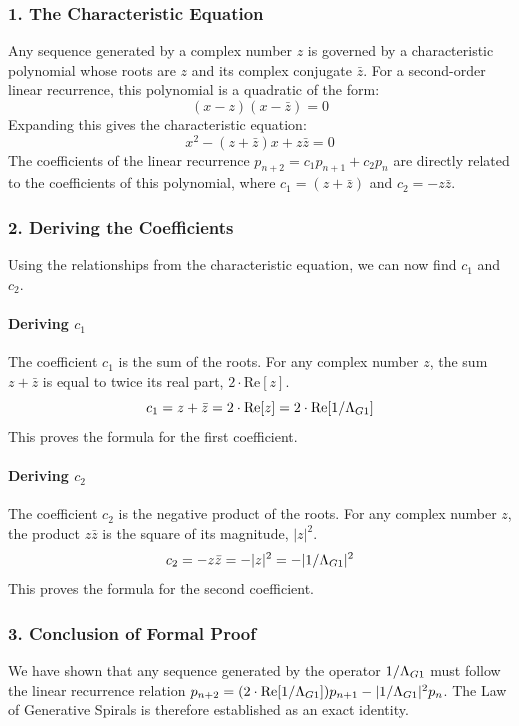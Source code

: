 \subsubsection{1. The Characteristic Equation}
Any sequence generated by a complex number $z$ is governed by a characteristic polynomial whose roots are $z$ and its complex conjugate $\bar{z}$. For a second-order linear recurrence, this polynomial is a quadratic of the form:
$$ (x - z)(x - \bar{z}) = 0 $$
Expanding this gives the characteristic equation:
$$ x^2 - (z + \bar{z})x + z\bar{z} = 0 $$
The coefficients of the linear recurrence $p_{n+2} = c_1 p_{n+1} + c_2 p_n$ are directly related to the coefficients of this polynomial, where $c_1 = (z+\bar{z})$ and $c_2 = -z\bar{z}$.

\subsubsection{2. Deriving the Coefficients}
Using the relationships from the characteristic equation, we can now find $c_1$ and $c_2$.

\paragraph{Deriving $c_1$}
The coefficient $c_1$ is the sum of the roots. For any complex number $z$, the sum $z+\bar{z}$ is equal to twice its real part, $2 \cdot \text{Re}[z]$.
$$ c_1 = z + \bar{z} = 2 \cdot \text{Re}[z] = 2 \cdot \text{Re}[1/\Lambda_{G1}] $$
This proves the formula for the first coefficient.

\paragraph{Deriving $c_2$}
The coefficient $c_2$ is the negative product of the roots. For any complex number $z$, the product $z\bar{z}$ is the square of its magnitude, $|z|^2$.
$$ c_2 = -z\bar{z} = -|z|^2 = -|1/\Lambda_{G1}|^2 $$
This proves the formula for the second coefficient.

\subsubsection{3. Conclusion of Formal Proof}
We have shown that any sequence generated by the operator $1/\Lambda_{G1}$ must follow the linear recurrence relation $p_{n+2} = (2 \cdot \text{Re}[1/\Lambda_{G1}]) p_{n+1} - |1/\Lambda_{G1}|^2 p_n$. The Law of Generative Spirals is therefore established as an exact identity.

